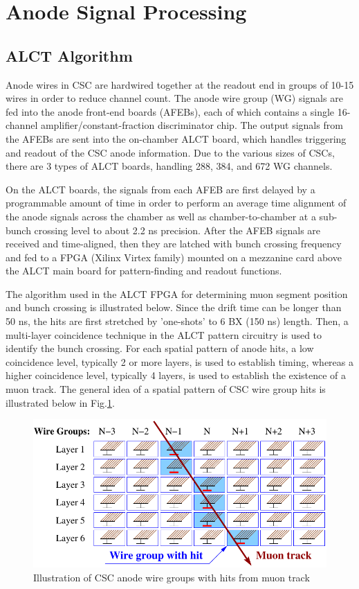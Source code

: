 \section{Anode Signal Processing}
\label{sec:alct}

\subsection{ALCT Algorithm}
\label{subsec:alct_algo}

Anode wires in CSC are hardwired together at the readout end in groups of 10-15 wires in order to reduce channel count. The anode wire group (WG) signals are fed into the anode front-end boards (AFEBs), each of which contains a single 16-channel amplifier/constant-fraction discriminator chip. The output signals from the AFEBs are sent into the on-chamber ALCT board, which handles triggering and readout of the CSC anode information. Due to the various sizes of CSCs, there are 3 types of ALCT boards, handling 288, 384, and 672 WG channels.

On the ALCT boards, the signals from each AFEB are first delayed by a programmable amount of time in order to perform an average time alignment of the anode signals across the chamber as well as chamber-to-chamber at a sub-bunch crossing level to about 2.2 ns precision. After the AFEB signals are received and time-aligned, then they are latched with bunch crossing frequency and fed to a FPGA (Xilinx Virtex family) mounted on a mezzanine card above the ALCT main board for pattern-finding and readout functions.

The algorithm used in the ALCT FPGA for determining muon segment position and bunch crossing is illustrated below. Since the drift time can be longer than 50 ns, the hits are first stretched by 'one-shots' to 6 BX (150 ns) length. Then, a multi-layer coincidence technique in the ALCT pattern circuitry is used to identify the bunch crossing. For each spatial pattern of anode hits, a low coincidence level, typically 2 or more layers, is used to establish timing, whereas a higher coincidence level, typically 4 layers, is used to establish the existence of a muon track. The general idea of a spatial pattern of CSC wire group hits is illustrated below in Fig.\ref{fig:anode_wire_group_hits}.

\begin{figure}[tbh]
        \begin{center}
                \includegraphics[width=0.6\linewidth]{figures/anode_wire_group_hits.pdf}
                \caption{Illustration of CSC anode wire groups with hits from muon track}
                \label{fig:anode_wire_group_hits}
        \end{center}
\end{figure}

